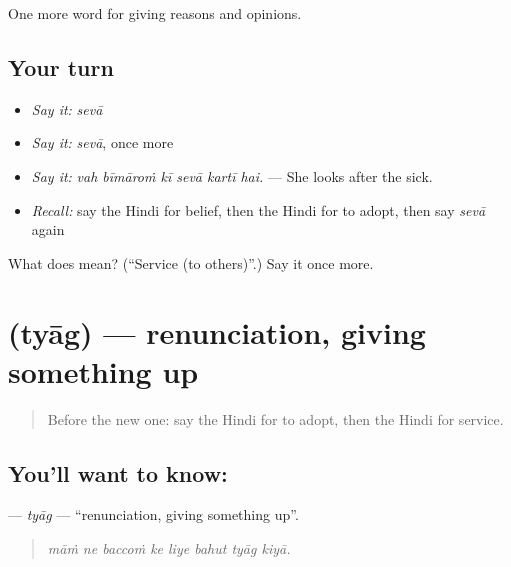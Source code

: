 \begin{grammarlens}[title={What you've built}]
One more word for giving reasons and opinions.
\end{grammarlens}

\subsection*{Your turn}
\begin{itemize}
\raggedright
  \item \emph{Say it:} \emph{sevā}
  \item \emph{Say it:} \emph{sevā}, once more
  \item \emph{Say it:} \emph{vah bīmāroṁ kī sevā kartī hai.} — She looks after the sick.
  \item \emph{Recall:} say the Hindi for belief, then the Hindi for to adopt, then say \emph{sevā} again
\end{itemize}

\begin{tcolorbox}[breakable,colback=teal!4,colframe=teal!35!black,title={Before you move on}]
What does  mean? (\textquotedblleft{}Service (to others)\textquotedblright{}.) Say it once more.
\end{tcolorbox}
\section[\texorpdfstring{\hi{त्याग} (tyāg)}{त्याग (tyāg)}]{ (tyāg) — renunciation, giving something up}

\label{lesson:HI-C358-tyag}



\begin{quote}
Before the new one: say the Hindi for to adopt, then the Hindi for service.
\end{quote}

\subsection*{You'll want to know: }
\textbf{} — \emph{tyāg} — \textquotedblleft{}renunciation, giving something up\textquotedblright{}.

\begin{quote}
       
\end{quote}

\begin{quote}
\emph{māṁ ne baccoṁ ke liye bahut tyāg kiyā.}
\end{quote}

